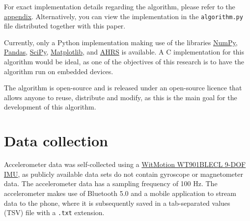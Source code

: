 \documentclass[12pt]{report}
\begin{document}
\clearpage

For exact implementation details regarding the algorithm,
please refer to the \hyperref[orgf85d410]{appendix}.
Alternatively, you can view the implementation in the
\texttt{algorithm.py} file distributed together with this paper.

Currently, only a Python implementation
making use of the libraries \href{https://numpy.org/}{NumPy}, \href{https://pandas.pydata.org/}{Pandas}, \href{https://scipy.org/}{SciPy}, \href{https://matplotlib.org/}{Matplotlib},
and \href{https://ahrs.readthedocs.io/en/latest/}{AHRS} is available.
A C implementation for this algorithm would be ideal,
as one of the objectives of this research is to have the algorithm run
on embedded devices.

The algorithm is open-source and is released under an open-source
licence that allows anyone to reuse, distribute and modify,
as this is the main goal for the development of this algorithm.

\clearpage
\section{Data collection}
\label{sec:org303f7f9}
\label{orgdcbbb87}
Accelerometer data was self-collected
using a \href{https://witmotion-sensor.com/collections/bluetooth-accerometer/products/bluetooth-5-0-accelerometer-inclinometer-wt901blecl-mpu9250-high-precision-9-axis-gyroscope-anglexy-0-05-accuracy-magnetometer-with-kalman-filter-low-power-3-axis-ahrs-imu-sensor-for-arduino}{WitMotion WT901BLECL 9-DOF IMU},
as publicly available data sets do not contain gyroscope
or magnetometer data.
The accelerometer data has a sampling frequency of 100 Hz.
The accelerometer makes use of Bluetooth 5.0 and a mobile application
to stream data to the phone, where it is subsequently saved
in a tab-separated values (TSV) file with a \texttt{.txt} extension.
\end{document}
